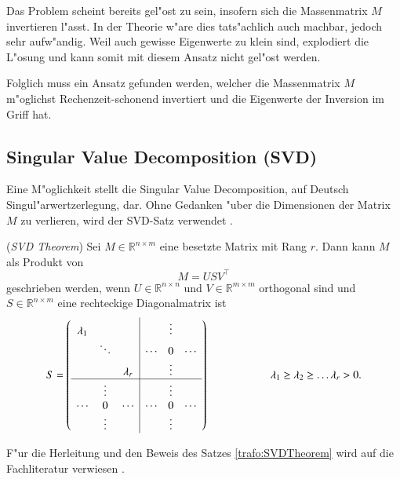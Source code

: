 \begin{refsection}
Das Problem scheint bereits gel"ost zu sein, insofern sich die Massenmatrix $M$ invertieren l"asst. In der Theorie w"are dies tats"achlich auch machbar, jedoch sehr aufw"andig. Weil auch gewisse Eigenwerte zu klein sind, explodiert die L"osung und kann somit mit diesem Ansatz nicht gel"ost werden.

Folglich muss ein Ansatz gefunden werden, welcher die Massenmatrix $M$ m"oglichst Rechenzeit-schonend invertiert und die Eigenwerte der Inversion im Griff hat. 


\subsection{Singular Value Decomposition (SVD) }
Eine M"oglichkeit stellt die Singular Value Decomposition, auf Deutsch Singul"arwertzerlegung, dar. Ohne Gedanken "uber die Dimensionen der Matrix $M$ zu verlieren, wird der SVD-Satz verwendet \cite{trafo:Watkins}. 

\begin{satz}
	\label{trafo:SVDTheorem}
	(\textit{SVD Theorem}) Sei $M\in \mathbb{R}^{n \times m}$ eine besetzte Matrix mit Rang $r$. Dann kann $M$ als Produkt von
	\begin{equation}
		M = USV^\top
		\label{trafo:svd}
	\end{equation} 
	geschrieben werden, wenn $U \in \mathbb{R}^{n \times n}$ und $V \in \mathbb{R}^{m \times m}$ orthogonal sind und $S \in \mathbb{R}^{n \times m}$ eine rechteckige Diagonalmatrix ist 
	\begin{equation*}
		S = \left( 
			\begin{array}{ccc|ccc}
				\lambda_1 &          &          &        & \vdots &        \\
				& \ddots   &          & \cdots & 0      & \cdots \\
				&          & \lambda_r &        & \vdots &        \\
				\hline
				&  \vdots  &          &        & \vdots &        \\
				\cdots   &  0       & \cdots   & \cdots & 0      & \cdots \\
				&  \vdots  &          &        & \vdots &   \\				
				\end{array}
			\right) 
			\hspace{2cm}\lambda_1 \geq \lambda_2 \geq \dots \lambda_r > 0. 
	\end{equation*}
\end{satz}
F"ur die Herleitung und den Beweis des Satzes \ref{trafo:SVDTheorem} wird auf die Fachliteratur verwiesen \cite{trafo:Watkins}.


\end{refsection}
